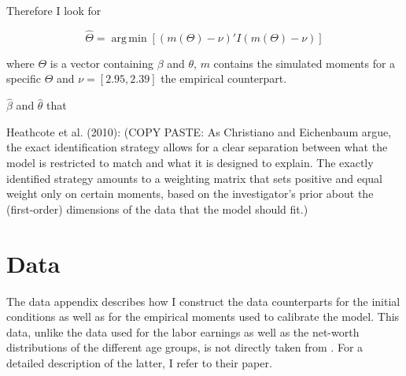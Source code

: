 \documentclass[a4paper,12pt,legno]{article}
\begin{document}
Therefore I look for 

\[ \widehat{\Theta} = \operatorname{arg\,min}[(m(\Theta )-\nu)'I(m(\Theta )-\nu)] \]

where $\Theta$ is a vector containing $\beta$ and $\theta$, $m$ contains the simulated moments for a specific $\Theta$ and $\nu = [2.95,2.39]$ the empirical counterpart. 

$\hat{\beta}$ and $\hat{\theta}$ that 




Heathcote et al. (2010): (COPY PASTE: As Christiano and Eichenbaum argue, the exact identification strategy allows for a clear separation between what the model is restricted to match and what it is designed to explain. The exactly identified strategy amounts to a weighting matrix that sets positive and equal weight only on certain moments, based on the investigator's prior about the (first-order) dimensions of the data that the model should fit.)

\section{Data}
\label{data}
The data appendix describes how I construct the data counterparts for the initial conditions as well as for the empirical moments used to calibrate the model. This data, unlike the data used for the labor earnings as well as the net-worth distributions of the different age groups, is not directly taken from \cite{hintermaier2011}. For a detailed description of the latter, I refer to their paper. \\
\end{document}
